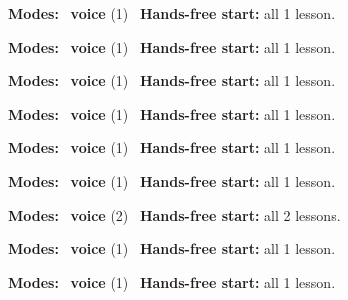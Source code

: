 \expandafter\def\csname hlchaptermodality204\endcsname{%
  {\small\noindent
    \textbf{Modes:} \hlvoicesign{}~\textbf{voice} (1)\quad
    \hlvoicesign{}~\textbf{Hands-free start:} all 1 lesson.%
    \par}\medskip
}

\expandafter\def\csname hlchaptermodality205\endcsname{%
  {\small\noindent
    \textbf{Modes:} \hlvoicesign{}~\textbf{voice} (1)\quad
    \hlvoicesign{}~\textbf{Hands-free start:} all 1 lesson.%
    \par}\medskip
}

\expandafter\def\csname hlchaptermodality206\endcsname{%
  {\small\noindent
    \textbf{Modes:} \hlvoicesign{}~\textbf{voice} (1)\quad
    \hlvoicesign{}~\textbf{Hands-free start:} all 1 lesson.%
    \par}\medskip
}

\expandafter\def\csname hlchaptermodality207\endcsname{%
  {\small\noindent
    \textbf{Modes:} \hlvoicesign{}~\textbf{voice} (1)\quad
    \hlvoicesign{}~\textbf{Hands-free start:} all 1 lesson.%
    \par}\medskip
}

\expandafter\def\csname hlchaptermodality208\endcsname{%
  {\small\noindent
    \textbf{Modes:} \hlvoicesign{}~\textbf{voice} (1)\quad
    \hlvoicesign{}~\textbf{Hands-free start:} all 1 lesson.%
    \par}\medskip
}

\expandafter\def\csname hlchaptermodality209\endcsname{%
  {\small\noindent
    \textbf{Modes:} \hlvoicesign{}~\textbf{voice} (1)\quad
    \hlvoicesign{}~\textbf{Hands-free start:} all 1 lesson.%
    \par}\medskip
}

\expandafter\def\csname hlchaptermodality210\endcsname{%
  {\small\noindent
    \textbf{Modes:} \hlvoicesign{}~\textbf{voice} (2)\quad
    \hlvoicesign{}~\textbf{Hands-free start:} all 2 lessons.%
    \par}\medskip
}

\expandafter\def\csname hlchaptermodality211\endcsname{%
  {\small\noindent
    \textbf{Modes:} \hlvoicesign{}~\textbf{voice} (1)\quad
    \hlvoicesign{}~\textbf{Hands-free start:} all 1 lesson.%
    \par}\medskip
}

\expandafter\def\csname hlchaptermodality212\endcsname{%
  {\small\noindent
    \textbf{Modes:} \hlvoicesign{}~\textbf{voice} (1)\quad
    \hlvoicesign{}~\textbf{Hands-free start:} all 1 lesson.%
    \par}\medskip
}

